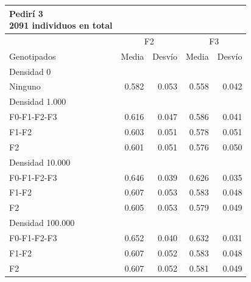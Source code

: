 \documentclass[11pt,spanish,a4paper,oneside,]{book} %
\begin{document}
\begin{longtable}{lrrrr}
\caption*{
{\large Pedirí 3} \\ 
{\small 2091 individuos en total}
} \\ 
\toprule
 & \multicolumn{2}{c}{F2} & \multicolumn{2}{c}{F3} \\ 
 \cmidrule(lr){2-3} \cmidrule(lr){4-5}
Genotipados & Media & Desvío & Media & Desvío \\ 
\midrule
\multicolumn{1}{l}{Densidad 0} \\ 
\midrule
Ninguno & 0.582 & 0.053 & 0.558 & 0.042 \\ 
\midrule
\multicolumn{1}{l}{Densidad 1.000} \\ 
\midrule
F0-F1-F2-F3 & 0.616 & 0.047 & 0.586 & 0.041 \\ 
F1-F2 & 0.603 & 0.051 & 0.578 & 0.051 \\ 
F2 & 0.601 & 0.051 & 0.576 & 0.050 \\ 
\midrule
\multicolumn{1}{l}{Densidad 10.000} \\ 
\midrule
F0-F1-F2-F3 & 0.646 & 0.039 & 0.626 & 0.035 \\ 
F1-F2 & 0.607 & 0.053 & 0.583 & 0.048 \\ 
F2 & 0.605 & 0.053 & 0.579 & 0.049 \\ 
\midrule
\multicolumn{1}{l}{Densidad 100.000} \\ 
\midrule
F0-F1-F2-F3 & 0.652 & 0.040 & 0.632 & 0.031 \\ 
F1-F2 & 0.607 & 0.052 & 0.583 & 0.048 \\ 
F2 & 0.607 & 0.052 & 0.581 & 0.049 \\ 
 \bottomrule
\end{longtable}
\captionsetup[table]{labelformat=empty,skip=1pt}
\end{document}
